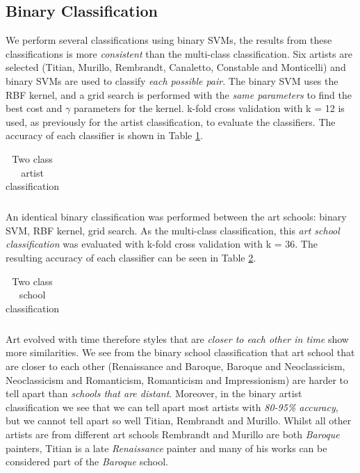 \documentclass[11pt,a4paper,twoside,openright,draft]{report}
\begin{document}
\begin{multicols}{2}
\section{Binary Classification}

We perform several classifications using binary SVMs, the results from these
classifications is more \emph{consistent} than the multi-class classification.
Six artists are selected (Titian, Murillo, Rembrandt, Canaletto, Constable and
Monticelli) and binary SVMs are used to classify \emph{each possible pair}.
The binary SVM uses the RBF kernel, and a grid search is performed with the
\emph{same parameters} to find the best cost and $\gamma$ parameters for the
kernel.  k-fold cross validation with k = 12 is used, as previously for the
artist classification, to evaluate the classifiers.  The accuracy of each
classifier is shown in Table \ref{tab:foldart}.

\begin{table}[ptb]
\centering
\begin{tabular}{r||r|r|r|r|r}
\toprule

\bottomrule
\end{tabular}
\caption[Two class artist classification]{Two class artist classification}
\label{tab:foldart}
\end{table}

An identical binary classification was performed between the art schools:
binary SVM, RBF kernel, grid search.  As the multi-class classification, this
\emph{art school classification} was evaluated with k-fold cross validation
with k = 36.  The resulting accuracy of each classifier can be seen in Table
\ref{tab:foldsch}.

\begin{table}[ptb]
\centering
{}
\begin{tabular}{r||r|r|r|r|r}
\toprule

\bottomrule
\end{tabular}
\caption[Two class school classification]{Two class school classification}
\label{tab:foldsch}
\end{table}

Art evolved with time therefore styles that are \emph{closer to each other in
time} show more similarities.  We see from the binary school classification
that art school that are closer to each other (Renaissance and Baroque, Baroque
and Neoclassicism, Neoclassicism and Romanticism, Romanticism and
Impressionism) are harder to tell apart than \emph{schools that are distant}.
Moreover, in the binary artist classification we see that we can tell apart
most artists with \emph{80-95\% accuracy}, but we cannot tell apart so well
Titian, Rembrandt and Murillo.  Whilst all other artists are from different art
schools Rembrandt and Murillo are both \emph{Baroque} painters, Titian is a
late \emph{Renaissance} painter and many of his works can be considered part of
the \emph{Baroque} school.


\end{multicols}
\end{document}
